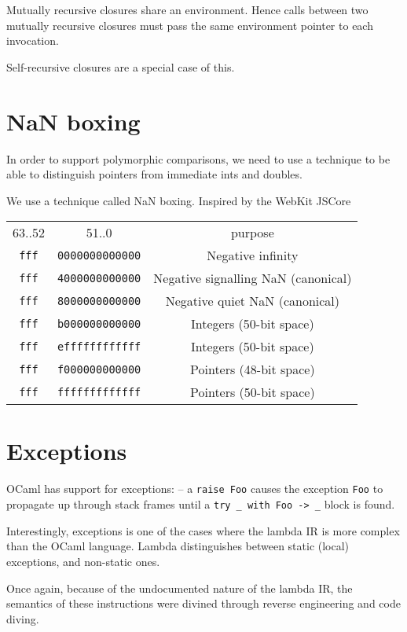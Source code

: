 \documentclass[12pt,a4paper,twoside,openright]{report}
\begin{document}
Mutually recursive closures share an environment. Hence calls between two mutually recursive closures must pass the same environment pointer to each invocation.

Self-recursive closures are a special case of this.


\section{NaN boxing}

In order to support polymorphic comparisons, we need to use a technique to be able to distinguish pointers from immediate ints and doubles.

We use a technique called NaN boxing. Inspired by the WebKit JSCore

\begin{tabular}{c c c}
    63..52 & 51..0 & purpose \\
    \lstinline!fff! & \lstinline!0000000000000! & Negative infinity \\
    \lstinline!fff! & \lstinline!4000000000000! & Negative signalling NaN (canonical) \\
    \lstinline!fff! & \lstinline!8000000000000! & Negative quiet NaN (canonical) \\
    \lstinline!fff! & \lstinline!b000000000000! & Integers (50-bit space) \\
    \lstinline!fff! & \lstinline!effffffffffff! & Integers (50-bit space) \\
    \lstinline!fff! & \lstinline!f000000000000! & Pointers (48-bit space) \\
    \lstinline!fff! & \lstinline!fffffffffffff! & Pointers (50-bit space)
\end{tabular}



\section{Exceptions}

OCaml has support for exceptions: -- a \lstinline!raise Foo! causes the exception \lstinline!Foo! to propagate up through stack frames until a \lstinline!try _ with Foo -> _! block is found.

Interestingly, exceptions is one of the cases where the lambda IR is more complex than the OCaml language. Lambda distinguishes between static (local) exceptions, and non-static ones.

Once again, because of the undocumented nature of the lambda IR, the semantics of these instructions were divined through reverse engineering and code diving.
\end{document}
